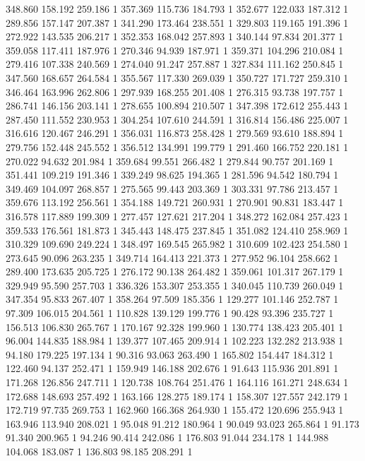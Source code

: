 	348.860	158.192	259.186	1
	357.369	115.736	184.793	1
	352.677	122.033	187.312	1
	289.856	157.147	207.387	1
	341.290	173.464	238.551	1
	329.803	119.165	191.396	1
	272.922	143.535	206.217	1
	352.353	168.042	257.893	1
	340.144	97.834	201.377	1
	359.058	117.411	187.976	1
	270.346	94.939	187.971	1
	359.371	104.296	210.084	1
	279.416	107.338	240.569	1
	274.040	91.247	257.887	1
	327.834	111.162	250.845	1
	347.560	168.657	264.584	1
	355.567	117.330	269.039	1
	350.727	171.727	259.310	1
	346.464	163.996	262.806	1
	297.939	168.255	201.408	1
	276.315	93.738	197.757	1
	286.741	146.156	203.141	1
	278.655	100.894	210.507	1
	347.398	172.612	255.443	1
	287.450	111.552	230.953	1
	304.254	107.610	244.591	1
	316.814	156.486	225.007	1
	316.616	120.467	246.291	1
	356.031	116.873	258.428	1
	279.569	93.610	188.894	1
	279.756	152.448	245.552	1
	356.512	134.991	199.779	1
	291.460	166.752	220.181	1
	270.022	94.632	201.984	1
	359.684	99.551	266.482	1
	279.844	90.757	201.169	1
	351.441	109.219	191.346	1
	339.249	98.625	194.365	1
	281.596	94.542	180.794	1
	349.469	104.097	268.857	1
	275.565	99.443	203.369	1
	303.331	97.786	213.457	1
	359.676	113.192	256.561	1
	354.188	149.721	260.931	1
	270.901	90.831	183.447	1
	316.578	117.889	199.309	1
	277.457	127.621	217.204	1
	348.272	162.084	257.423	1
	359.533	176.561	181.873	1
	345.443	148.475	237.845	1
	351.082	124.410	258.969	1
	310.329	109.690	249.224	1
	348.497	169.545	265.982	1
	310.609	102.423	254.580	1
	273.645	90.096	263.235	1
	349.714	164.413	221.373	1
	277.952	96.104	258.662	1
	289.400	173.635	205.725	1
	276.172	90.138	264.482	1
	359.061	101.317	267.179	1
	329.949	95.590	257.703	1
	336.326	153.307	253.355	1
	340.045	110.739	260.049	1
	347.354	95.833	267.407	1
	358.264	97.509	185.356	1
	129.277	101.146	252.787	1
	97.309	106.015	204.561	1
	110.828	139.129	199.776	1
	90.428	93.396	235.727	1
	156.513	106.830	265.767	1
	170.167	92.328	199.960	1
	130.774	138.423	205.401	1
	96.004	144.835	188.984	1
	139.377	107.465	209.914	1
	102.223	132.282	213.938	1
	94.180	179.225	197.134	1
	90.316	93.063	263.490	1
	165.802	154.447	184.312	1
	122.460	94.137	252.471	1
	159.949	146.188	202.676	1
	91.643	115.936	201.891	1
	171.268	126.856	247.711	1
	120.738	108.764	251.476	1
	164.116	161.271	248.634	1
	172.688	148.693	257.492	1
	163.166	128.275	189.174	1
	158.307	127.557	242.179	1
	172.719	97.735	269.753	1
	162.960	166.368	264.930	1
	155.472	120.696	255.943	1
	163.946	113.940	208.021	1
	95.048	91.212	180.964	1
	90.049	93.023	265.864	1
	91.173	91.340	200.965	1
	94.246	90.414	242.086	1
	176.803	91.044	234.178	1
	144.988	104.068	183.087	1
	136.803	98.185	208.291	1
